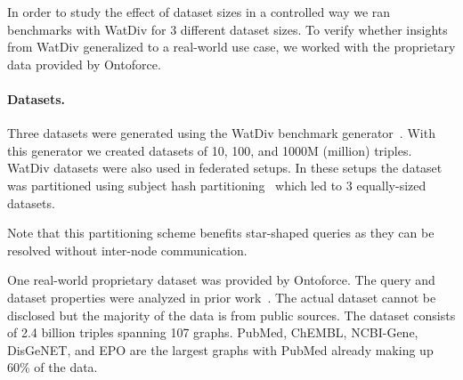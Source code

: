 In order to study the effect of dataset sizes in a controlled way we ran benchmarks with WatDiv for 3 different dataset sizes. To verify
whether insights from WatDiv generalized to a real-world use case, we worked with the proprietary data provided by Ontoforce.

\paragraph{Datasets.} 
Three datasets were generated using the WatDiv benchmark generator~\cite{alucc2014diversified}. 
With this generator we created datasets of 10, 100, and 1000M (million) triples. 
WatDiv datasets were also used in federated setups. 
In these setups the dataset was partitioned using subject hash partitioning~\cite{Zeng, Harth} which led to 3 equally-sized datasets.

Note that this partitioning scheme benefits star-shaped queries as they can be resolved without inter-node communication.

One real-world proprietary dataset was provided by Ontoforce. 
The query and dataset properties were analyzed in prior work~\cite{dewitte_swat4ls_2016}. The actual dataset cannot be disclosed but the majority of the data is from public sources. The dataset consists of 2.4 billion triples spanning 107 graphs. 
PubMed, ChEMBL, NCBI-Gene, DisGeNET, and EPO are the largest graphs with PubMed already making up 60\% of the data.

